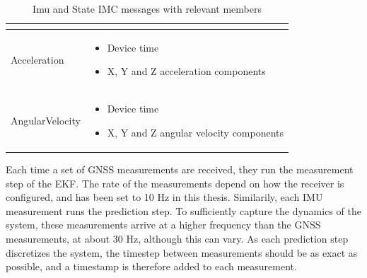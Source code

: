 \begin{table}[!htbp]
\begin{tabularx}{\textwidth}{ |l|X| }
\begin{minipage}[t]{0.7\textwidth}
\begin{itemize}
            \end{itemize}
        \end{minipage}\\\hline
        Acceleration & 
        \begin{minipage}[t]{0.7\textwidth}
            \begin{itemize}
                \item Device time
                \item X, Y and Z acceleration components
            \end{itemize}
        \end{minipage}\\\hline
        AngularVelocity & 
        \begin{minipage}[t]{0.7\textwidth}
            \begin{itemize}
                \item Device time
                \item X, Y and Z angular velocity components
            \end{itemize}
        \end{minipage}\\\hline
    \end{tabularx}
    \caption{Imu and State IMC messages with relevant members}
    \label{tab:imc-filter}
    \end{table}
    Each time a set of GNSS measurements are received, they run the measurement step of the EKF. The rate of the measurements depend on how the receiver is configured, and has been set to 10 Hz in this thesis. Similarily, each IMU measurement runs the prediction step. To sufficiently capture the dynamics of the system, these measurements arrive at a higher frequency than the GNSS measurements, at about 30 Hz, although this can vary. As each prediction step discretizes the system, the timestep between measurements should be as exact as possible, and a timestamp is therefore added to each measurement.\\ 
    

